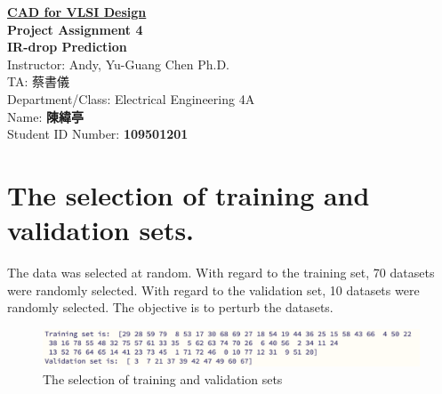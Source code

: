 \documentclass{article}
\begin{document}
\thispagestyle{empty}

\begin{center}
        \vspace*{3cm} %
        {\Huge\bf
            \underline{CAD for VLSI Design }\\}%
        \vspace{3cm}
        {\bf\huge Project Assignment 4\\}
        \vspace{0.5cm}
        {\bf\fontsize{23pt}{20}\selectfont IR-drop Prediction\\}
        \vspace{4cm}
        {\fontsize{23pt}{26pt} \selectfont Instructor: Andy, Yu-Guang Chen  Ph.D.\\}
        {\fontsize{20pt}{26pt} \selectfont TA: 蔡書儀\\}
        \vspace{2cm}
        \fontsize{22pt}{25pt}\selectfont
        Department/Class: Electrical Engineering 4A\\
        \vspace*{1em}
        Name: {\bf 陳緯亭}\\
        \vspace*{1em}
        Student ID Number: {\bf 109501201}\\
\vspace{2cm}
\end{center}
\newpage


\tableofcontents
\listoflistings


\thispagestyle{empty}
\newpage


 \setcounter{page}{1}




\section{The selection of training and validation sets.}

The data was selected at random. With regard to the training set, 70 datasets were randomly selected. With regard to the validation set, 10 datasets were randomly selected. The objective is to perturb the datasets.

\begin{figure}[H]
    \centering
    \includegraphics[width=\linewidth]{./img/2024-06-13-22-32-17.png}
    \caption{The selection of training and validation sets}
    \label{sel}
  \end{figure}
\end{document}
